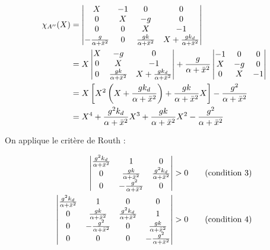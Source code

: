 \documentclass[10pt]{article}
\begin{document}
\begin{align}
	\chi_{A''} (X) &=
	\begin{vmatrix}
		X & -1 & 0 & 0 \\
		0 & X & -g & 0 \\
		0 & 0 & X & -1 \\
		- \frac{g}{\alpha + \bar x^2} & 0 & \frac{g k}{\alpha + \bar x^2} & X + \frac{g k_d}{\alpha + \bar x^2}
	\end{vmatrix} \notag \\
	&= X \begin{vmatrix}
		X & -g & 0 \\
		0 & X & -1 \\
		0 & \frac{g k}{\alpha + \bar x^2} & X + \frac{g k_d}{\alpha + \bar x^2}
	\end{vmatrix} + 
	\frac{g}{\alpha + \bar x^2} \begin{vmatrix}
		-1 & 0 & 0 \\
		X & -g & 0 \\
		0 & X & -1
	\end{vmatrix} \notag \\
	&= X \left[ X^2 \left( X + \frac{g k_d}{\alpha + \bar x^2} \right) + \frac{gk}{\alpha + \bar x^2} X \right]
		- \frac{g^2}{\alpha + \bar x^2} \notag \\
	&= X^4 + \frac{g^2 k_d}{\alpha + \bar x^2} X^3 +  \frac{gk}{\alpha + \bar x^2} X^2
		- \frac{g^2}{\alpha + \bar x^2} \notag
\end{align}

\noindent On applique le critère de Routh :

\begin{align}
	\begin{vmatrix}
		\frac{g^2 k_d}{\alpha + \bar x^2} & 1 & 0 \\
		0 & \frac{gk}{\alpha + \bar x^2} &\frac{g^2 k_d}{\alpha + \bar x^2} \\
		0 & - \frac{g^2}{\alpha + \bar x^2} & 0
	\end{vmatrix}
	&> 0 \tag{\text{condition} 3} \\
	\begin{vmatrix}
		\frac{g^2 k_d}{\alpha + \bar x^2} & 1 & 0 & 0 \\
		0 & \frac{gk}{\alpha + \bar x^2} &\frac{g^2 k_d}{\alpha + \bar x^2} & 1 \\
		0 & - \frac{g^2}{\alpha + \bar x^2} & 0 & \frac{gk}{\alpha + \bar x^2} \\
		0 & 0 & 0 & - \frac{g^2}{\alpha + \bar x^2}
	\end{vmatrix}
	&> 0 \tag{\text{condition} 4}
\end{align}
\end{document}
